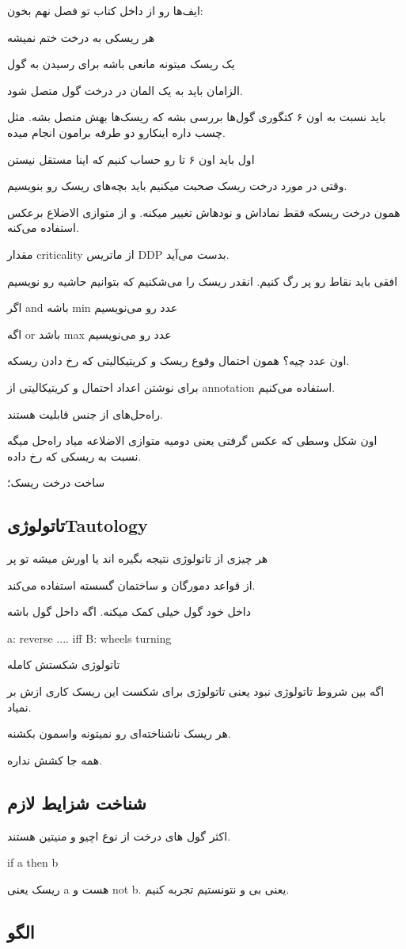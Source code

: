 ایف‌ها رو از داخل کتاب تو فصل نهم بخون:

هر ریسکی به درخت ختم نمیشه

یک ریسک میتونه مانعی باشه برای رسیدن به گول

الزامان باید به یک المان در درخت گول متصل شود.

باید نسبت به اون ۶ کتگوری گول‌ها بررسی بشه که ریسک‌ها بهش متصل بشه.
مثل چسب داره اینکارو دو طرفه برامون انجام میده.

اول باید اون ۶ تا رو حساب کنیم که اینا مستقل نیستن

وقتی در مورد درخت ریسک صحبت میکنیم باید بچه‌های ریسک رو بنویسیم.

همون درخت ریسکه فقط نماداش و نود‌هاش تغییر میکنه. و از متوازی الاضلاع برعکس
استفاده می‌کنه.

مقدار criticality از ماتریس DDP بدست می‌آید.

افقی باید نقاط رو پر رگ کنیم.
انقدر ریسک را می‌شکنیم که بتوانیم حاشیه رو نویسیم

اگر and باشه min عدد رو می‌نویسیم

اگه or باشد max عدد رو می‌نویسیم

اون عدد چیه؟ همون احتمال وقوع ریسک و کریتیکالیتی که رخ دادن ریسکه.

برای نوشتن اعداد احتمال و کریتیکالیتی از annotation استفاده می‌کنیم.

راه‌حل‌های از جنس قابلیت هستند.

اون شکل وسطی که عکس گرفتی یعنی دومیه متوازی الاضلاعه میاد راه‌حل میگه نسبت به
ریسکی که رخ داده.

ساخت درخت ریسک؛

\subsection{تاتولوژیTautology}

هر چیزی از تاتولوژی نتیجه بگیره اند یا اورش میشه تو پر

از قواعد دمورگان و ساختمان گسسته استفاده می‌کند.

داخل خود گول خیلی کمک میکنه. اگه داخل گول باشه

a: reverse .... iff B: wheels turning

تاتولوژی شکستش کامله

اگه بین شروط تاتولوژی نبود یعنی تاتولوژی برای شکست این ریسک کاری ازش بر نمیاد.

هر ریسک ناشناخته‌ای رو نمیتونه واسمون بکشنه.

همه جا کشش نداره.

\subsection{شناخت شزایط لازم}

اکثر گول ‌های درخت از نوع اچیو و منیتین هستند.

if a then b

ریسک یعنی a هست و not b. یعنی بی و نتونستیم تجربه کنیم.

\subsection{الگو}

